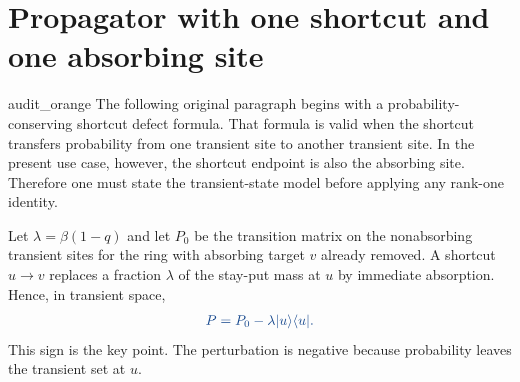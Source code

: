 \documentclass[10pt, hidelinks, superscriptaddress, amsmath, amssymb, aps, pre]{revtex4-2}
\newcommand{\auditcorrected}[1]{\textcolor{audit_blue}{#1}}
\begin{document}



\clearpage

\section*{Propagator with one shortcut and one absorbing site}

\begin{auditbox}{audit_orange}
The following original paragraph begins with a probability-conserving shortcut
defect formula.  That formula is valid when the shortcut transfers probability
from one transient site to another transient site.  In the present use case,
however, the shortcut endpoint is also the absorbing site.  Therefore one must
state the transient-state model before applying any rank-one identity.

Let $\lambda=\beta(1-q)$ and let $P_0$ be the transition matrix on the
nonabsorbing transient sites for the ring with absorbing target $v$ already
removed.  A shortcut $u\to v$ replaces a fraction $\lambda$ of the stay-put
mass at $u$ by immediate absorption.  Hence, in transient space,
\begin{align}
\auditcorrected{P=P_0-\lambda |u\rangle\langle u|.}
\label{eq:audit_transient_killing}
\end{align}
This sign is the key point.  The perturbation is negative because probability
leaves the transient set at $u$.
\end{auditbox}
\end{document}
